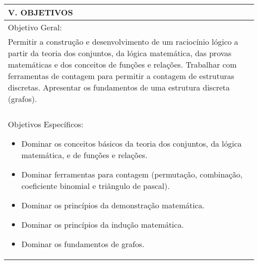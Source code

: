 \documentclass[12pt]{article}
\begin{document}
\begin{longtable}{|L{1.025\textwidth}|} \hline
%
{\bf V. OBJETIVOS } \\ \hline
%
Objetivo Geral:\\

Permitir a construção e desenvolvimento de um raciocínio lógico a partir da teoria dos conjuntos, da lógica matemática, das provas matemáticas e dos conceitos de funções e relações. Trabalhar com ferramentas de contagem para permitir a contagem de estruturas discretas. Apresentar os fundamentos de uma estrutura discreta (grafos). \\
\\
Objetivos Específicos:
\begin{itemize}
\item Dominar os conceitos básicos da teoria dos conjuntos, da lógica matemática, e de funções e relações.
\item Dominar ferramentas para contagem (permutação, combinação, coeficiente binomial e triângulo de pascal).
\item Dominar os princípios da demonstração matemática.
\item Dominar os princípios da indução matemática.
\item Dominar os fundamentos de grafos.
\end{itemize}
\\ \hline
\end{longtable}
\end{document}
